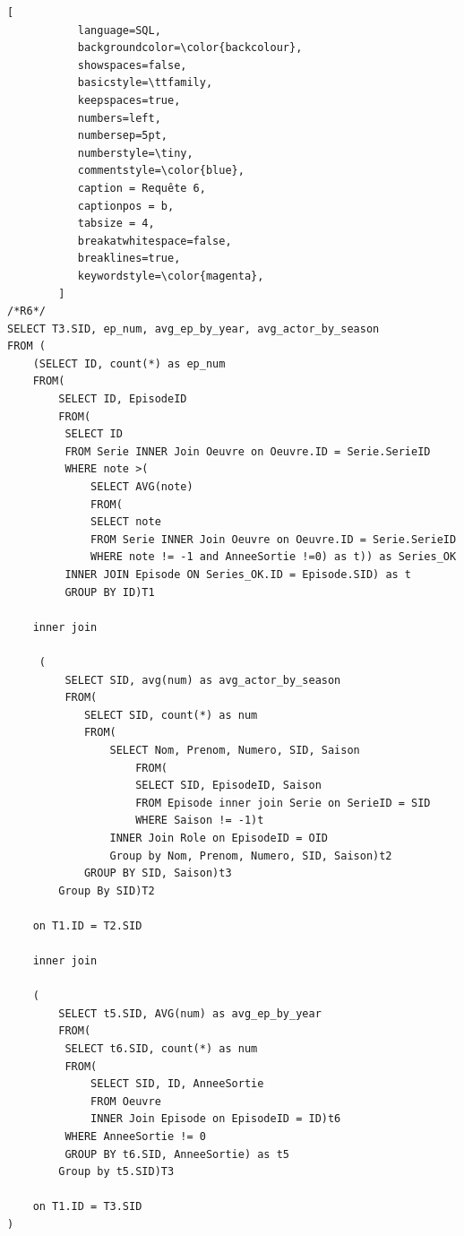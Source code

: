 \documentclass[10pt,a4paper]{article}
\begin{document}
\begin{lstlisting}[
           language=SQL,
           backgroundcolor=\color{backcolour},
           showspaces=false,
           basicstyle=\ttfamily,
           keepspaces=true,                 
           numbers=left,                    
           numbersep=5pt,
           numberstyle=\tiny,
           commentstyle=\color{blue},
           caption = Requête 6,
           captionpos = b,
           tabsize = 4,
           breakatwhitespace=false,         
    	   breaklines=true,
           keywordstyle=\color{magenta},
        ]
/*R6*/
SELECT T3.SID, ep_num, avg_ep_by_year, avg_actor_by_season
FROM (
	(SELECT ID, count(*) as ep_num
	FROM(
		SELECT ID, EpisodeID
		FROM(
		 SELECT ID
		 FROM Serie INNER Join Oeuvre on Oeuvre.ID = Serie.SerieID
		 WHERE note >(
			 SELECT AVG(note)
			 FROM(
			 SELECT note
			 FROM Serie INNER Join Oeuvre on Oeuvre.ID = Serie.SerieID
			 WHERE note != -1 and AnneeSortie !=0) as t)) as Series_OK
		 INNER JOIN Episode ON Series_OK.ID = Episode.SID) as t
		 GROUP BY ID)T1

	inner join

	 (
		 SELECT SID, avg(num) as avg_actor_by_season
		 FROM(
			SELECT SID, count(*) as num
			FROM(
				SELECT Nom, Prenom, Numero, SID, Saison
					FROM(
					SELECT SID, EpisodeID, Saison
					FROM Episode inner join Serie on SerieID = SID
					WHERE Saison != -1)t
				INNER Join Role on EpisodeID = OID
				Group by Nom, Prenom, Numero, SID, Saison)t2
			GROUP BY SID, Saison)t3
		Group By SID)T2

	on T1.ID = T2.SID

	inner join

	(
		SELECT t5.SID, AVG(num) as avg_ep_by_year
		FROM(
		 SELECT t6.SID, count(*) as num
		 FROM(
			 SELECT SID, ID, AnneeSortie
			 FROM Oeuvre
			 INNER Join Episode on EpisodeID = ID)t6
		 WHERE AnneeSortie != 0
		 GROUP BY t6.SID, AnneeSortie) as t5
		Group by t5.SID)T3

	on T1.ID = T3.SID
)
   
\end{lstlisting}
\end{document}
